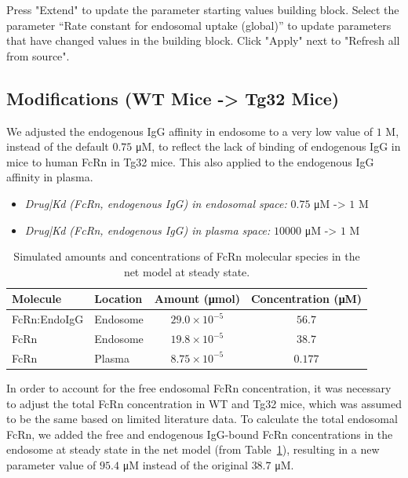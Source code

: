 \documentclass[fleqn,10pt]{physiome}
\begin{document}
Press "Extend" to update the parameter starting values building block. Select the parameter ``Rate constant for endosomal uptake (global)'' to update parameters that have changed values in the building block. Click "Apply" next to "Refresh all from source".



\subsection{Modifications (WT Mice -> Tg32 Mice)}\label{MC}

We adjusted the endogenous IgG affinity in endosome to a very low value of $1$ M, instead of the default $0.75$ \si{\micro M}, to reflect the lack of binding of endogenous IgG in mice to human FcRn in Tg32 mice. This also applied to the endogenous IgG affinity in plasma.

\begin{itemize}
    \item \textit{Drug|Kd (FcRn, endogenous IgG) in endosomal space:} $0.75$ \si{\micro M} -> $1$ \si{M}
    \item \textit{Drug|Kd (FcRn, endogenous IgG) in plasma space:} $10000$ \si{\micro M} -> $1$ \si{M}
\end{itemize}

\begin{table}[htbp]
\centering
    \begin{threeparttable}
        \caption{Simulated amounts and concentrations of FcRn molecular species in the net model at steady state.}\label{tbl:1}
        \begin{tabular}{llcc}
            \toprule
            Molecule & Location & Amount (\si{\micro mol}) & Concentration (\si{\micro M}) \\
            \midrule
            FcRn:EndoIgG & Endosome & $29.0\times10^{-5}$ & $56.7$ \\
            FcRn & Endosome & $19.8\times10^{-5}$ & $38.7$ \\
            FcRn & Plasma & $8.75\times10^{-5}$ & $0.177$ \\
            \bottomrule
        \end{tabular}
    \end{threeparttable}
\end{table}

In order to account for the free endosomal FcRn concentration, it was necessary to adjust the total FcRn concentration in WT and Tg32 mice, which was assumed to be the same based on limited literature data. To calculate the total endosomal FcRn, we added the free and endogenous IgG-bound FcRn concentrations in the endosome at steady state in the net model (from Table~\ref{tbl:1}), resulting in a new parameter value of $95.4$ \si{\micro M} instead of the original $38.7$ \si{\micro M}.
\end{document}
